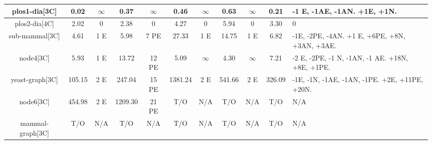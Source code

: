 \begin{table}[t]
{\begin{tabular}[t]{|c@{}|@{}c@{}|@{}c@{}|@{}c@{}|@{}c@{}|@{}c@{}|@{}c@{}|@{}c@{}|@{}c@{}|@{}c@{}|@{}C{4cm}@{}|}
		plos1-dia[3C]& 0.02 &$\infty$& 0.37 &$\infty$& 0.46 & $\infty$ & 0.63 &$\infty$& 0.21 & -1 E, -1AE, -1AN. +1E, +1N. \\\hline
		plos2-dia[4C] & 2.02 & 0   & 2.38 & 0  & 4.27  & 0 & 5.94 & 0 &  3.30 & 0 \\\hline
		sub-mammal[3C]  & 4.61 & 1 E  & 5.98 & 7 PE & 27.33 & 1 E & 14.75 & 1 E & 6.82  & -1E, -2PE, -4AN. +1 E, +6PE, +8N, +3AN, +3AE. \\\hline
		node4[3C]  & 5.93  & 1 E   &  13.72 & 12 PE  &  5.09  & $\infty$ & 4.30 &$\infty$& 7.21  & -2 E, -2PE, -1 N, -1AN, -1 AE. +18N, +8E, +1PE.\\\hline
		yeast-graph[3C]   & 105.15    & 2 E  &   247.04  & 15 PE   & 1381.24  & 2 E  & 541.66   & 2 E & 326.09  &  -1E, -1N, -1AE, -1AN, -1PE. +2E, +11PE, +20N. \\\hline
	   	node6[3C]  &  454.98  & 2 E  &  1209.30    & 21 PE    &  T/O  & N/A      &  T/O   &  N/A   &  T/O     & N/A \\\hline
		mammal-graph[3C]  &  T/O     & N/A  &  T/O     & N/A    &  T/O         & N/A      &  T/O    &  N/A    &  T/O     & N/A\\\hline
	\end{tabular}}
\end{table}
